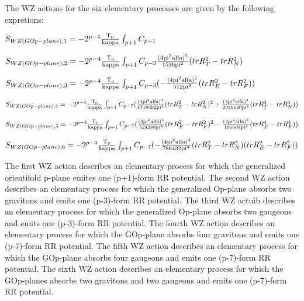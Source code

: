 \documentclass[a4paper,a4paper]{article}
\begin{document}
The WZ actions for the six elementary processes are given by the following 
expretions:
\begin{center}
{  $ S_{WZ(GOp-plane),1} = -2^{p-4}\frac{\rm T_p}{\rm kappa}\int_{p+1} C_{p+1}$ }
\end{center} 
\begin{center}
{  $ S_{WZ(GOp-plane),2} = -2^{p-4}\frac{\rm T_p}{\rm kappa}\int_{p+1} C_{p-3}{\frac{\rm (4pi^2alfa)^2 }{\rm 1536pi^2}}{(trR_T^2- trR_N^2)}$ }
\end{center}
\begin{center}
{  $ S_{WZ(GOp-plane),3} = -2^{p-4}\frac{\rm T_p}{\rm kappa}\int_{p+1} C_{p-3}(-  \frac{\rm (4pi^2alfa)^2}{\rm 512pi^2}{(trR_E^2- trR_F^2)})$ }
\end{center}
\begin{center}
{  $ S_{WZ(GOp-plane),4} = -2^{p-4}\frac{\rm T_p}{\rm kappa}\int_{p+1} C_{p-7}(\frac{\rm(4pi^2alfa)^4 }{\rm 4718592pi^4}{{(trR_T^2- trR_N^2)^2}}+\frac{\rm (4pi^2alfa)^4}{\rm 2949120pi^4}{(trR_T^4- trR_N^4)})$ }
\end{center}
\begin{center}
{  $ S_{WZ(GOp-plane),5} = -2^{p-4}\frac{\rm T_p}{\rm kappa}\int_{p+1} C_{p-7}(\frac{\rm (4pi^2alfa)^4 }{\rm 524288pi^4}{{(trR_E^2-trR_F^2)^2}}-\frac{\rm(4pi^2alfa)^4  }{\rm 196608pi^4}{(trR_E^4- trR_F^4)})$ }
\end{center}
\begin{center}
{  $ S_{WZ(GOp-plane),6} = -2^{p-4}\frac{\rm T_p}{\rm kappa}\int_{p+1} C_{p-7}(-\frac{\rm(4pi^2alfa)^4 }{\rm 786432pi^4}{(trR_T^2- trR_N^2)(trR_E^2- trR_F^2)})$ }
\end{center}

The first WZ action describes an elementary process for which the generalized orientifold p-plane emites one (p+1)-form RR potential.
The second WZ action describes an elementary process for which the generalized
Op-plane absorbs two gravitons and emits one (p-3)-form RR potential.
The third WZ actuib describes an elementary process for which the generalized Op-plane absorbs two gaugeons and emits one (p-3)-form RR potential.
The fourth WZ action describes an elementary process for which the GOp-plane absorbs four gravitons and emits one (p-7)-form RR potential. 
The fifth WZ action describes an elementary process for which the GOp-plane absorbs four gaugeons and emits one (p-7)-form RR potential.
The sixth WZ action describes an elementary process for which the GOp-planes absorbs two gravitons and two gaugeons and emits one (p-7)-form RR potential.
\end{document}
